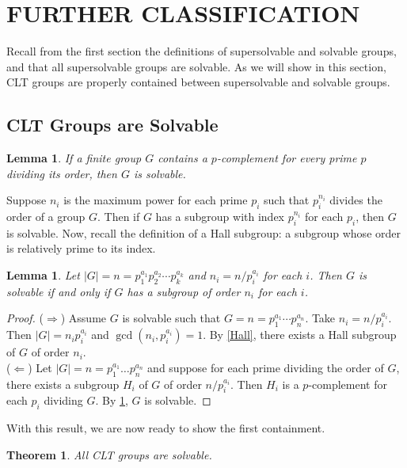 \documentclass[12pt]{report}
\theoremstyle{newthm}
\newtheorem{Theorem}[lem]{Theorem}
\newtheorem{Lemma}[lem]{Lemma}
\begin{document}
\newpage
\section{FURTHER CLASSIFICATION}
Recall from the first section the definitions of supersolvable and solvable groups, and that all supersolvable groups are solvable. As we will show in this section, CLT groups are properly contained between supersolvable and solvable groups.

\subsection{CLT Groups are Solvable}
\begin{Lemma}\label{p comp div order}\cite[Theorem 9.3.3]{Hall} If a finite group $G$ contains a $p$-complement for every prime $p$ dividing its order, then $G$ is solvable. 
\end{Lemma}

Suppose $n_i$ is the maximum power for each prime $p_i$ such that $p_i^{n_i}$ divides the order of a group $G$. Then if $G$ has a subgroup with index $p_i^{n_i}$ for each $p_i$, then $G$ is solvable.  Now, recall the definition of a Hall subgroup: a subgroup whose order is relatively prime to its index.

\begin{Lemma}\label{n_i for each i}\cite[Lemma 1]{Bray}  Let $|G|=n=p_1^{a_1}p_2^{a_2}\dotsi p_k^{a_k}$ and $n_i = n/p_i^{a_i}$ for each $i$. Then $G$ is solvable if and only if $G$ has a subgroup of order $n_i$ for each $i$.
\end{Lemma}

\begin{proof}
($\Rightarrow$) Assume $G$ is solvable such that $G=n=p_1^{a_1}\dotsi p_n^{a_n}$. Take $n_i = n/{p_i^{a_i}}.$ Then $|G| = n_ip_i^{a_i}$ and $\gcd(n_i,p_i^{a_i})=1$. By \ref{Hall}, there exists a Hall subgroup of $G$ of order $n_i$.\\
($\Leftarrow$) Let $|G|= n = p_1^{a_1}\dots p_n^{a_n}$ and suppose for each prime dividing the order of $G$, there exists a subgroup $H_i$ of $G$ of order $n/{p_i^{a_i}}$. Then $H_i$ is a $p$-complement for each $p_i$ dividing $G$. By \cref{p comp div order}, $G$ is solvable.
\end{proof}
With this result, we are now ready to show the first containment. 

\begin{Theorem}\label{clt then solvable}\cite[Theorem 1]{Bray} All CLT groups are solvable.
\end{Theorem}
\end{document}
